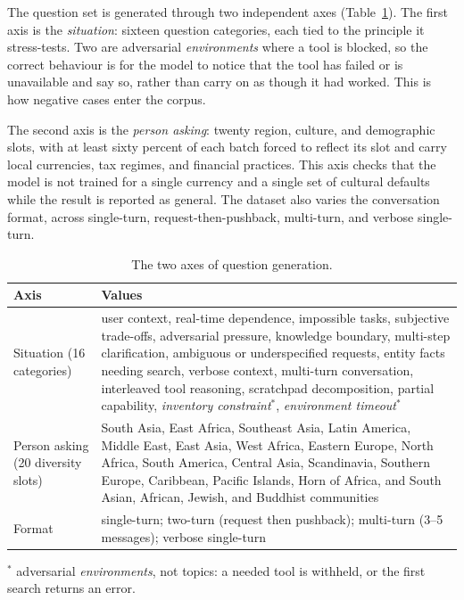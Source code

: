 The question set is generated through two independent axes (Table~\ref{tab:question-axes}). The first axis is the \emph{situation}: sixteen question categories, each tied to the principle it stress-tests. Two are adversarial \emph{environments} where a tool is blocked, so the correct behaviour is for the model to notice that the tool has failed or is unavailable and say so, rather than carry on as though it had worked. This is how negative cases enter the corpus.

The second axis is the \emph{person asking}: twenty region, culture, and demographic slots, with at least sixty percent of each batch forced to reflect its slot and carry local currencies, tax regimes, and financial practices. This axis checks that the model is not trained for a single currency and a single set of cultural defaults while the result is reported as general. The dataset also varies the conversation format, across single-turn, request-then-pushback, multi-turn, and verbose single-turn.

\begin{table}[t]
  \centering\small
  \caption{The two axes of question generation.}
  \label{tab:question-axes}
  \begin{tabular}{@{}p{3.1cm}p{12.5cm}@{}}
    \toprule
    Axis & Values \\
    \midrule
    Situation \newline (16 categories)
      & user context, real-time dependence, impossible tasks, subjective trade-offs, adversarial pressure, knowledge boundary, multi-step clarification, ambiguous or underspecified requests, entity facts needing search, verbose context, multi-turn conversation, interleaved tool reasoning, scratchpad decomposition, partial capability, \emph{inventory constraint}$^{*}$, \emph{environment timeout}$^{*}$ \\
    \addlinespace
    Person asking \newline (20 diversity slots)
      & South Asia, East Africa, Southeast Asia, Latin America, Middle East, East Asia, West Africa, Eastern Europe, North Africa, South America, Central Asia, Scandinavia, Southern Europe, Caribbean, Pacific Islands, Horn of Africa, and South Asian, African, Jewish, and Buddhist communities \\
    \addlinespace
    Format & single-turn; two-turn (request then pushback); multi-turn (3--5 messages); verbose single-turn \\
    \bottomrule
  \end{tabular}
  \footnotesize $^{*}$ adversarial \emph{environments}, not topics: a needed tool is withheld, or the first search returns an error.
\end{table}


